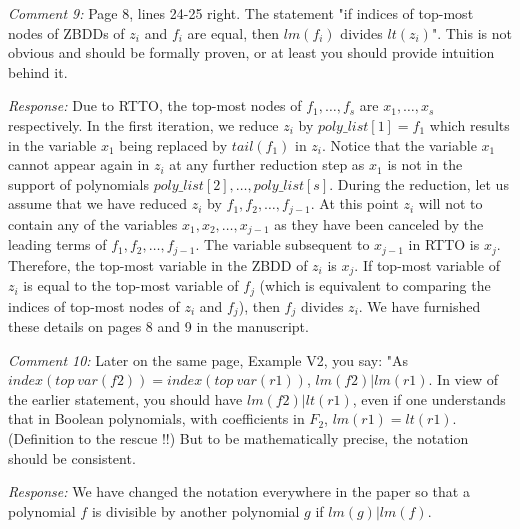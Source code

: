 \documentclass[conference, onecolumn]{IEEEtran}
\begin{document}
\par{\it Comment 9:} Page 8, lines 24-25 right. The statement "if indices of top-most nodes of ZBDDs of $z_i$ and $f_i$ are equal, then $lm(f_i)$ divides $lt(z_i)$". This is not obvious and should be formally proven, or at least you should provide intuition behind it.
\par{\it Response:} Due to RTTO, the top-most nodes of $f_1,\dots,f_s$ are $x_1,\dots,x_s$ respectively. 
In the first iteration, we reduce $z_i$ by $poly\_list[1]=f_1$ which results in
the variable $x_1$ being replaced by $tail(f_1)$ in $z_i$. Notice that
the variable $x_1$ cannot appear  
again in $z_i$ at any further reduction step as $x_1$ is not in the support of 
polynomials $poly\_list[2],\dots,poly\_list[s]$.
During the reduction, let us assume that we have reduced $z_i$ by
$f_1,f_2,\dots,f_{j-1}$. At this point $z_i$ will not to contain
any of the variables $x_1,x_2,\dots,x_{j-1}$ as they have been canceled
by the leading terms of $f_1,f_2,\dots,f_{j-1}$. The variable
subsequent to $x_{j-1}$ in RTTO is $x_j$. Therefore, the top-most
variable in the ZBDD of $z_i$ is $x_j$.
If top-most variable of $z_i$ is equal to the top-most variable of
$f_j$ (which is equivalent to comparing the indices of top-most nodes
of $z_i$ and $f_j$), then $f_j$ divides $z_i$. 
We have furnished these details on pages 8 and 9 in the manuscript.

\par{\it Comment 10:} Later on the same page, Example V2, you say:
"As $index(top~var(f2)) = index(top~var(r1))$, $lm( f2) | lm(r1)$.
In view of the earlier statement, you should have $lm( f2) | lt(r1)$,
even if one understands that in Boolean polynomials, with coefficients
in $F_2$, $lm(r1) = lt(r1)$. (Definition to the rescue !!) But to be
mathematically precise, the notation should be consistent. 
\par{\it Response:} We have changed the notation everywhere in the
paper so that a polynomial $f$ is divisible by another polynomial $g$
if $lm(g)|lm(f)$. 
\end{document}
